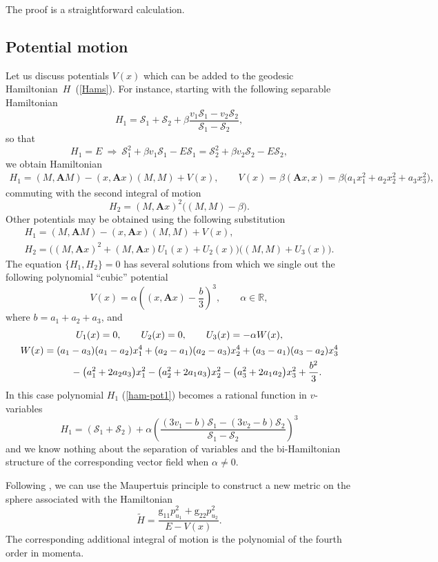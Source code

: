 \documentclass[10pt,a4paper]{amsart}
\numberwithin{equation}{section}
\begin{document}
The proof is a straightforward calculation.


\subsection{Potential motion}
Let us discuss potentials $V(x)$ which can be added to the geodesic Hamiltonian~$H$~(\ref{Hams}).
For instance, starting with the following separable Hamiltonian
\[
 H_1=\mathcal{S}_1+\mathcal{S}_2+\beta \frac{v_1\mathcal{S}_1-v_2\mathcal{S}_2}{\mathcal{S}_1-\mathcal{S}_2},
\]
so that
\[
H_1=E\ \Rightarrow\ \mathcal{S}_1^2+\beta v_1\mathcal{S}_1-E\mathcal{S}_1=\mathcal{S}_2^2+\beta v_2\mathcal{S}_2-E\mathcal{S}_2 ,
\]
we obtain Hamiltonian
\begin{gather*}
H_1=(M,\mathbf AM)-(x,\mathbf Ax)(M,M)+V(x) ,\qquad\!
V(x)=\beta(\mathbf A x,x)=\beta \big(a_1x_1^2+a_2x_2^2+a_3x_3^2\big) ,
\end{gather*}
commuting with the second integral of motion
\[
H_2= (M,\mathbf Ax)^2\bigl((M,M)-\beta\bigr).
\]
Other potentials may be obtained using the following substitution
\begin{gather}
H_1=(M,\mathbf AM)-(x,\mathbf Ax)(M,M)+V(x) ,\nonumber\\
H_2=\bigl( (M,\mathbf Ax)^2+(M,\mathbf Ax) U_1(x)+U_2(x)\bigr)\bigl((M,M)+U_3(x)\bigr) .\label{ham-pot1}
\end{gather}
The equation $\{H_1, H_2\}=0$ has several solutions from which we single out the following polynomial ``cubic'' potential
\[
V(x)=\alpha\left((x,\mathbf Ax) - \dfrac{b}{3}\right)^3 ,\qquad \alpha\in\mathbb R ,
\]
where $b=a_1+a_2+a_3$, and
\begin{gather*}
U_1(x)=0 ,\qquad U_2(x)=0 ,\qquad U_3(x)=-\alpha W(x) ,
\\
W(x)=(a_1 - a_3)(a_1 - a_2)x_1^4+(a_2-a_1)(a_2-a_3)x_2^4+(a_3-a_1)(a_3-a_2)x_3^4\\
\hphantom{W(x)=}{}
-\big(a_1^2 + 2a_2a_3\big)x_1^2-\big(a_2^2+2a_1a_3\big)x_2^2-\big(a_3^2+2a_1a_2\big)x_3^2+\dfrac{b^2}{3} .
\end{gather*}
In this case polynomial $H_1$ (\ref{ham-pot1}) becomes a rational function in $v$-variables
\[
H_1=(\mathcal{S}_1+\mathcal{S}_2)+\alpha\left(\frac{(3v_1-b)\mathcal{S}_1-(3v_2-b)\mathcal{S}_2}{\mathcal{S}_1-\mathcal{S}_2}\right)^3
\]
and we know nothing about the separation of variables and the bi-Hamiltonian structure of the corresponding vector field when $\alpha\neq 0 $.

Following \cite{bol95, ts99,ts01}, we can use the Maupertuis principle to construct a new metric on the sphere associated with the Hamiltonian
\[
\widetilde{H}=\frac{\mathrm g_{11}p^2_{u_1}+\mathrm g_{22}p^2_{u_2}}{E-V(x)} .
\]
The corresponding additional integral of motion is the polynomial of the fourth order in momenta.
\end{document}
